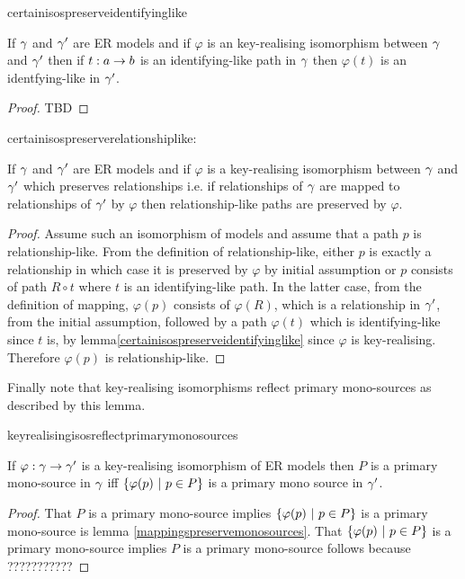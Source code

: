 certainisospreserveidentifyinglike
\begin{lemma}
\label{certainisospreserveidentifyinglike}
If $\gamma$ and $\gamma'$ are ER models and  if  $\varphi$ is an key-realising isomorphism between $\gamma$and $\gamma'$ then if $t:a \rightarrow b$ is an identifying-like  path in $\gamma$ then $\varphi(t)$ is an identfying-like in $\gamma'$.
\end{lemma}
\begin{proof}
TBD
\end{proof}

certainisospreserverelationshiplike:
\begin{lemma}
\label{certainisospreserverelationshiplike}
If $\gamma$ and $\gamma'$ are ER models and  if  $\varphi$ is a key-realising isomorphism between $\gamma$ and $\gamma'$  which preserves relationships  i.e. if relationships of $\gamma$ are mapped to relationships of $\gamma'$ by  $\varphi$ then relationship-like paths are preserved by $\varphi$.
\end{lemma}
\begin{proof}
Assume such an isomorphism of models and assume that a path $p$ is relationship-like.
From the definition of relationship-like, either $p$ is exactly a relationship in which case it is preserved by $\varphi$ by initial assumption or $p$ consists of path $R \circ t$ where $t$ is an identifying-like path.
In the latter case, from the definition of mapping, $\varphi(p)$ consists of $\varphi(R)$, which is a relationship in $\gamma'$, from the initial assumption, followed by a path $\varphi(t)$ which is identifying-like since $t$ is, by lemma\ref{certainisospreserveidentifyinglike} since $\varphi$ is key-realising. Therefore $\varphi(p)$ is relationship-like.
\end{proof}

Finally note that key-realising isomorphisms reflect primary mono-sources as described by this
lemma.

keyrealisingisosreflectprimarymonosources
\begin{lemma}
\label{keyrealisingisosreflectprimarymonosources}
If $\varphi: \gamma \rightarrow \gamma'$ is a key-realising isomorphism of ER models then
 $P$ is a primary mono-source in $\gamma$ iff $\left\{\varphi(p) \ \middle|\ p\in P\right\}$ is a primary mono source in $\gamma'$.
\end{lemma}
\begin{proof}
That $P$ is a primary mono-source implies $\left\{\varphi(p) \ \middle|\ p\in P\right\}$ is a primary mono-source is lemma \ref{mappingspreservemonosources}.
That $\left\{\varphi(p) \ \middle|\ p\in P\right\}$ is a primary mono-source implies $P$ is a primary mono-source follows because ???????????
\end{proof}

